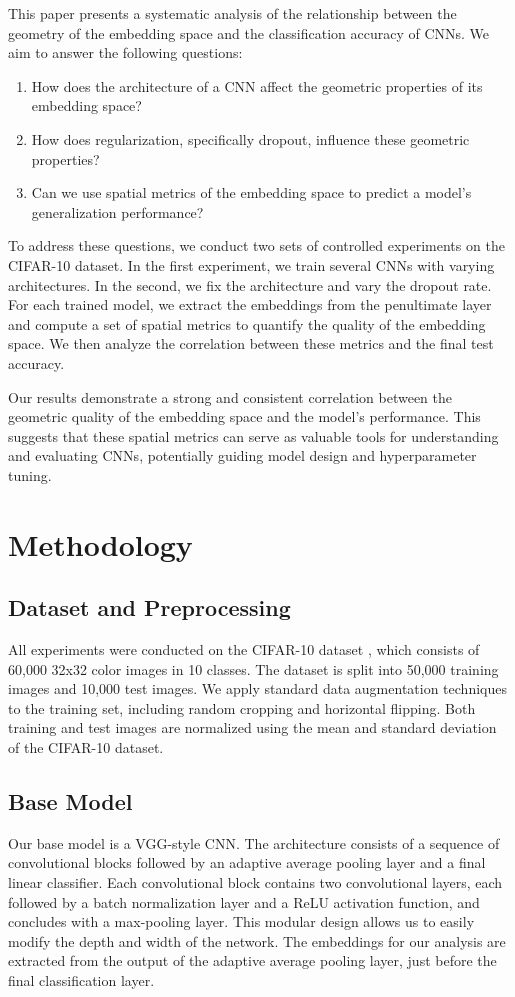 \documentclass[conference]{IEEEtran}
\begin{document}
This paper presents a systematic analysis of the relationship between the geometry of the embedding space and the classification accuracy of CNNs. We aim to answer the following questions:
\begin{enumerate}
    \item How does the architecture of a CNN affect the geometric properties of its embedding space?
    \item How does regularization, specifically dropout, influence these geometric properties?
    \item Can we use spatial metrics of the embedding space to predict a model's generalization performance?
\end{enumerate}

To address these questions, we conduct two sets of controlled experiments on the CIFAR-10 dataset. In the first experiment, we train several CNNs with varying architectures. In the second, we fix the architecture and vary the dropout rate. For each trained model, we extract the embeddings from the penultimate layer and compute a set of spatial metrics to quantify the quality of the embedding space. We then analyze the correlation between these metrics and the final test accuracy.

Our results demonstrate a strong and consistent correlation between the geometric quality of the embedding space and the model's performance. This suggests that these spatial metrics can serve as valuable tools for understanding and evaluating CNNs, potentially guiding model design and hyperparameter tuning.

\section{Methodology}

\subsection{Dataset and Preprocessing}
All experiments were conducted on the CIFAR-10 dataset \cite{CIFAR2010}, which consists of 60,000 32x32 color images in 10 classes. The dataset is split into 50,000 training images and 10,000 test images. We apply standard data augmentation techniques to the training set, including random cropping and horizontal flipping. Both training and test images are normalized using the mean and standard deviation of the CIFAR-10 dataset.

\subsection{Base Model}
Our base model is a VGG-style CNN. The architecture consists of a sequence of convolutional blocks followed by an adaptive average pooling layer and a final linear classifier. Each convolutional block contains two convolutional layers, each followed by a batch normalization layer and a ReLU activation function, and concludes with a max-pooling layer. This modular design allows us to easily modify the depth and width of the network. The embeddings for our analysis are extracted from the output of the adaptive average pooling layer, just before the final classification layer.
\end{document}
